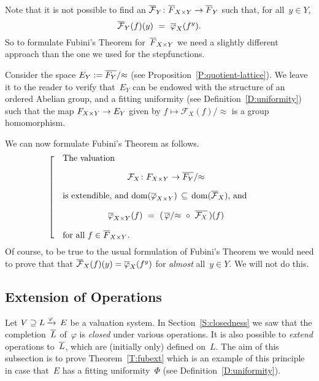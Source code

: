 \documentclass[main.tex]{subfiles}
\begin{document}
Note that it is not possible to find 
an $\overline{\mathcal{F}}_{Y}\colon \overline{F}_{X\times Y} \rightarrow \overline{F}_Y$
such that, for all~$y\in Y$,
\begin{equation*}
\overline{\mathcal{F}}_Y(f)(y) \ = \  \overline{\varphi}_X(f^y).
\end{equation*}
So to formulate Fubini's Theorem for~$\overline{F}_{X\times Y}$
we need a slightly different approach than
the one we used for the stepfunctions.

Consider the space $E_Y := \overline{F_Y}/{\approx}$
(see Proposition~\ref{P:quotient-lattice}).
We leave it to the reader to
verify that~$E_Y$ can be endowed with 
the structure of an ordered Abelian group,
and a fitting uniformity
(see Definition~\ref{D:uniformity})
such that the map $F_{X\times Y} \rightarrow E_Y$
given by $f\mapsto \mathcal{F}_X(f) /\approx$
is a group homomorphism.

We can now formulate Fubini's Theorem as follows.
\begin{equation}
\label{eq:fub}
\left[\quad
\begin{minipage}{.7\columnwidth}
The valuation 
\begin{equation*}
\mathcal{F}_X\colon F_{X\times Y} \ra \qvL{\ol{F_Y}}
\end{equation*}
is extendible, 
and $\mathrm{dom}(\ol{\varphi}_{X\times Y})
\,\subseteq\, 
 \mathrm{dom}(\ol{\mathcal{F}}_X)$,
and 
\begin{equation*}
\ol\varphi_{X\times Y}(f) \ =\ 
(\,\qvphi{\ol\varphi} \ \circ\  \ol{\mathcal{F}_X} \,)(f)
\end{equation*}
for all $f\in\ol{F}_{X\times Y}$.
\end{minipage}
\right.
\end{equation}
Of course,
to be true to the usual formulation of Fubini's Theorem
we would need to prove that
that $\overline{\mathcal{F}}_X(f)(y) = \overline{\varphi}_X(f^y)$
for \emph{almost} all~$y\in Y$.
We will not do this.

\subsection{Extension of Operations}
\label{SS:fub_part2}
Let $V \supseteq L\,\smash{\xrightarrow{\varphi}\,E}$ be a valuation system.
In Section~\ref{S:closedness}
we saw that the completion~$\overline{L}$ of~$\varphi$ is \emph{closed} under
various operations.
It is also possible to \emph{extend} operations
 to~$\overline{L}$, which are (initially only) defined on~$L$.
The aim of this subsection is to prove Theorem~\ref{T:fubext}
which is an example of this principle
in case that~$E$ has a fitting uniformity~$\Phi$
(see Definition~\ref{D:uniformity}).
\end{document}
